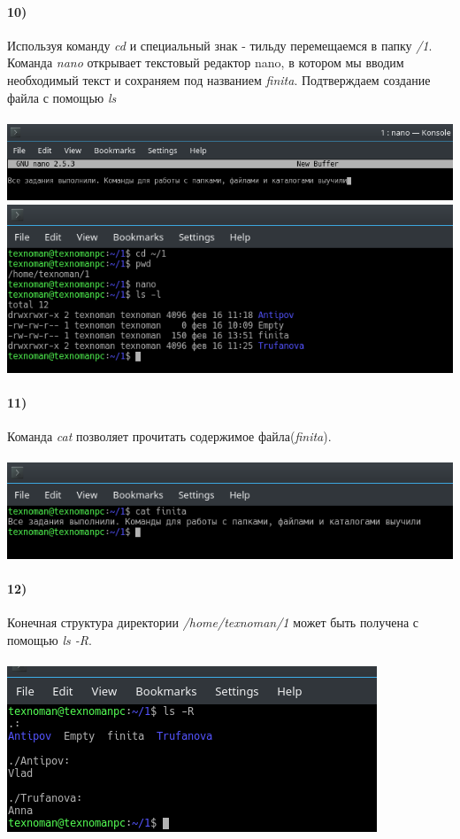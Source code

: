 	\paragraph{10)}
	Используя команду \textit{cd} и специальный знак - тильду перемещаемся в папку \textit{/1}. 
	Команда \textit{nano} открывает текстовый редактор nano,  в котором мы вводим необходимый текст и сохраняем под названием \textit{finita}. Подтверждаем создание файла с помощью \textit{ls}\\
	\\
	\includegraphics[width=\textwidth]{11.png}
	\\
	\includegraphics[width=\textwidth]{12.png}
	\\

	\paragraph{11)}
	Команда \textit{cat} позволяет прочитать содержимое файла(\textit{finita}).\\
	\\

	\includegraphics[width=\textwidth]{13.png}
	\\
	
	\paragraph{12)}
	Конечная структура директории \textit{/home/texnoman/1} может быть получена с помощью \textit{ls -R}.\\
	\\
	\includegraphics[width=\textwidth]{14.png}
	\\